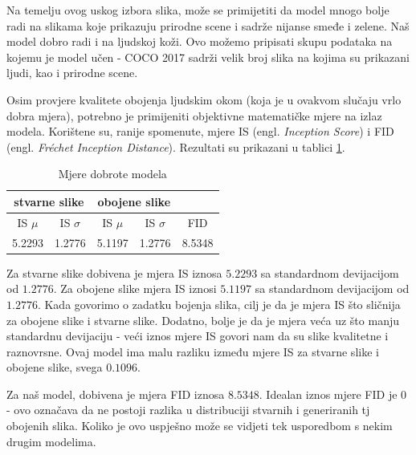 Na temelju ovog uskog izbora slika, može se primijetiti da model mnogo bolje radi na slikama koje prikazuju prirodne scene i sadrže nijanse smeđe i zelene. Naš model dobro radi i na ljudskoj koži. Ovo možemo pripisati skupu podataka na kojemu je model učen - COCO 2017 sadrži velik broj slika na kojima su prikazani ljudi, kao i prirodne scene.

Osim provjere kvalitete obojenja ljudskim okom (koja je u ovakvom slučaju vrlo dobra mjera), potrebno je primijeniti objektivne matematičke mjere na izlaz modela. Korištene su, ranije spomenute, mjere IS (engl. \textit{Inception Score}) i FID (engl. \textit{Fréchet Inception Distance}). Rezultati su prikazani u tablici \ref{table:model_mjere}.

\begin{table}[H]
    \centering
    \caption{Mjere dobrote modela}
    \label{table:model_mjere}
    \begin{tabular}{ |c|c|c|c|c| }
        \hline
          \multicolumn{2}{|c|}{stvarne slike} & \multicolumn{2}{|c|}{obojene slike} &  \\
        \hline
        IS $\mu$ & IS $\sigma$ & IS $\mu$ & IS $\sigma$ & FID \\
        \hline
        5.2293 & 1.2776 & 5.1197 & 1.2776 & 8.5348 \\
        \hline
    \end{tabular}
\end{table}

Za stvarne slike dobivena je mjera IS iznosa $5.2293$ sa standardnom devijacijom od $1.2776$. Za obojene slike mjera IS iznosi $5.1197$ sa standardnom devijacijom od $1.2776$. Kada govorimo o zadatku bojenja slika, cilj je da je mjera IS što sličnija za obojene slike i stvarne slike. Dodatno, bolje je da je mjera veća uz što manju standardnu devijaciju - veći iznos mjere IS govori nam da su slike kvalitetne i raznovrsne. Ovaj model ima malu razliku između mjere IS za stvarne slike i obojene slike, svega $0.1096$. 

Za naš model, dobivena je mjera FID iznosa $8.5348$. Idealan iznos mjere FID je $0$ - ovo označava da ne postoji razlika u distribuciji stvarnih i generiranih tj obojenih slika. Koliko je ovo uspješno može se vidjeti tek usporedbom s nekim drugim modelima.